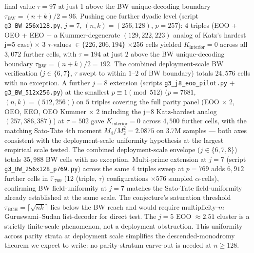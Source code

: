 \documentclass[11pt]{article}
\theoremstyle{definition}
\theoremstyle{remark}
\begin{document}
final value $\tau = 97$ at just $1$ above the BW unique-decoding
boundary $\tau_\text{BW} = (n + k)/2 = 96$. Pushing one further
dyadic level (script \texttt{g3\_BW\_256x128.py}, $j = 7$,
$(n, k) = (256, 128)$, $p = 257$): $4$ triples (EOO + OEO + EEO + a
Kummer-degenerate $(129, 222, 223)$ analog of Katz's hardest j=5 case)
$\times$ $3$ $\tau$-values $\in \{226, 206, 194\}$ $\times 256$ cells
yielded $K_\text{interior} = 0$ across all $3{,}072$ further cells,
with $\tau = 194$ at just $2$ above the BW unique-decoding boundary
$\tau_\text{BW} = (n+k)/2 = 192$. The combined deployment-scale BW
verification ($j \in \{6, 7\}$, $\tau$ swept to within $1$--$2$ of BW
boundary) totals $24{,}576$ cells with no exception. A further $j=8$ extension (scripts \texttt{g3\_j8\_eoo\_pilot.py} +
\texttt{g3\_BW\_512x256.py}) at the smallest $p \equiv 1 \pmod{512}$
($p = 7681$, $(n, k) = (512, 256)$) on $5$ triples covering the full
parity panel (EOO $\times$ 2, OEO, EEO, OEO Kummer $\times$ 2 including
the j=8 Katz-hardest analog $(257, 386, 387)$) at $\tau = 502$ gave
$K_\text{interior} = 0$ across $4{,}500$ further cells, with the matching
Sato-Tate 4th moment $M_4/M_2^2 = 2.0875$ on $3.7$M samples — both axes
consistent with the deployment-scale uniformity hypothesis at the largest
empirical scale tested. The combined deployment-scale envelope ($j \in
\{6, 7, 8\}$) totals $35{,}988$ BW cells with no exception. Multi-prime
extension at $j = 7$ (script \texttt{g3\_BW\_256x128\_p769.py}) across
the same 4 triples sweep at $p = 769$ adds $6{,}912$ further cells in
$\mathbb{F}_{769}$ (12 (triple, $\tau$) configurations $\times 576$
sampled $\alpha$-cells), confirming BW field-uniformity at $j = 7$
matches the Sato-Tate field-uniformity already established at the same
scale. The conjecture's
saturation threshold $\tau_\text{BCH} = \lceil\sqrt{nk}\rceil$ lies
below the BW reach and would require multiplicity-$m$ Guruswami--Sudan
list-decoder for direct test. The $j = 5$ EOO $\approx 2.51$
cluster is a strictly finite-scale phenomenon, not a deployment
obstruction. This uniformity across parity strata at deployment
scale simplifies the descended-monodromy theorem we expect to write:
no parity-stratum carve-out is needed at $n \geq 128$.
\end{document}
